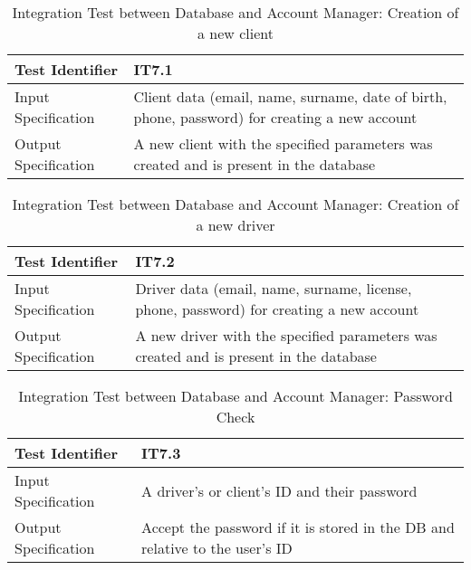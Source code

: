 \documentclass[a4paper]{article}
\begin{document}
\begin{table} [H]
\begin{center}
\begin{tabular}{| L | p{\rightcol} |}
  \hline
  Test Identifier & IT7.1 \\
  \hline
  Input Specification 
  & Client data (email, name, surname, date of birth, phone, password) for creating a new account \\
  \hline
  Output Specification & A new client with the specified parameters was created and is present in the database \\
  \hline
\end{tabular}
\end{center}
\caption{Integration Test between Database and Account Manager: Creation of a new client}
\end{table}

\begin{table} [H]
\begin{center}
\begin{tabular}{| L | p{\rightcol} |}
  \hline
  Test Identifier & IT7.2 \\
  \hline
  Input Specification 
  & Driver data (email, name, surname, license, phone, password) for creating a new account \\
  \hline
  Output Specification & A new driver with the specified parameters was created and is present in the database \\
  \hline
\end{tabular}
\end{center}
\caption{Integration Test between Database and Account Manager: Creation of a new driver}
\end{table}

\begin{table} [H]
\begin{center}
\begin{tabular}{| L | p{\rightcol} |}
  \hline
  Test Identifier & IT7.3 \\
  \hline
  Input Specification & A driver's or client's ID and their password \\
  \hline
  Output Specification & Accept the password if it is stored in the DB and relative to the user's ID\\
  \hline
\end{tabular}
\end{center}
\caption{Integration Test between Database and Account Manager: Password Check}
\end{table}
\end{document}

